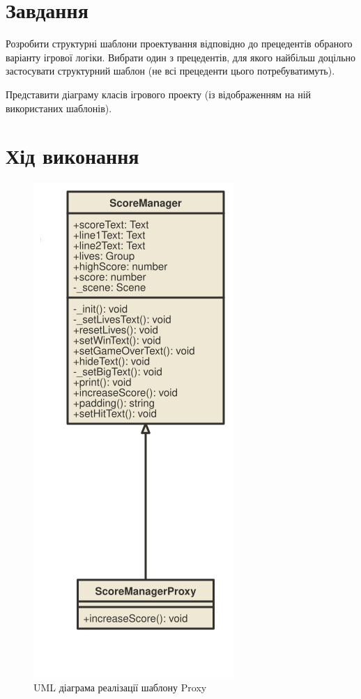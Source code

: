 \documentclass[oneside,14pt]{extarticle}
\begin{document}
\begin{normalsize}
	\section*{Завдання}
Розробити структурні шаблони проектування відповідно до прецедентів обраного
варіанту ігрової логіки. Вибрати один з прецедентів, для якого найбільш доцільно
застосувати структурний шаблон (не всі прецеденти цього потребуватимуть).

	Представити діаграму класів ігрового проекту (із відображенням на ній використаних
	шаблонів).

	\section*{Хід виконання}
	
	\begin{figure}[H]
		\centering
		\includegraphics[]{proxy}
		\caption{UML діаграма реалізації шаблону Proxy}
	\end{figure}
	

\end{normalsize}
\end{document}
